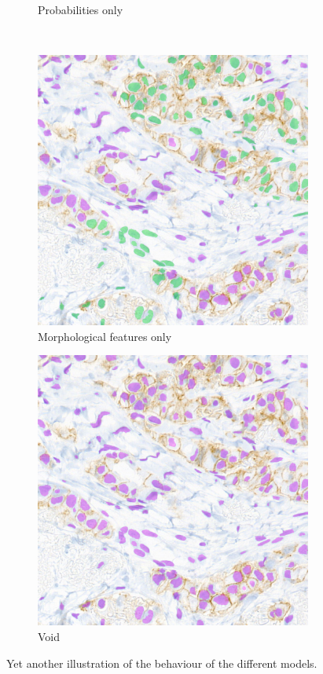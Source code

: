 \begin{figure}[H]
\begin{subfigure}[b]{0.45\textwidth}
    \caption{Probabilities only}
    \label{fig:breast-no-morph3}
  \end{subfigure}
  \\
  \begin{subfigure}[b]{0.45\textwidth}
    \includegraphics[width=\textwidth]{imgs/qual/breast/no-prior3.png}
    \caption{Morphological features only}
    \label{fig:breast-no-prior3}
  \end{subfigure}
  \hfill
  \begin{subfigure}[b]{0.45\textwidth}
    \includegraphics[width=\textwidth]{imgs/qual/breast/void3.png}
    \caption{Void}
    \label{fig:breast-void3}
  \end{subfigure}
  \caption{Yet another illustration of the behaviour of the different models.}
  \label{fig:breast-qual3}
\end{figure}

